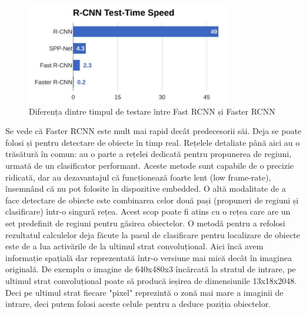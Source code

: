 \begin{figure}[h!]
    	\centering
	\captionsetup{justification=centering, margin=2cm}
	\includegraphics[width=0.8\textwidth]{figures/faster_rcnn_speed.png}
	\caption{Diferența dintre timpul de testare între  Fast RCNN și  Faster RCNN \cite{rcnn_vs_fast_rcnn}}
	\label{fig:class_detect_segment}
\end{figure}
Se vede că Faster RCNN este mult mai rapid decât predecesorii săi. Deja se poate folosi și pentru detectare de obiecte în timp real.\newline
Rețelele detaliate până aici au o trăsătură în comun: au o parte a rețelei dedicată pentru propunerea de regiuni, urmată de un clasificator performant. Aceste metode sunt capabile de o precizie ridicată, dar au dezavantajul că funcționează foarte lent (low frame-rate), însemnând că nu pot folosite în dispozitive embedded.\newline
O altă modalitate de a face detectare de obiecte este combinarea celor două pași (propuneri de regiuni și clasificare) într-o singură rețea. Acest scop poate fi atins cu o rețea care are un set predefinit de regiuni pentru găsirea obiectelor.\newline
O metodă pentru a refolosi rezultatul calculelor deja făcute la pasul de clasificare pentru localizare de obiecte este de a lua activările de la ultimul strat convoluțional. Aici încă avem informație spațială dar reprezentată într-o versiune mai mică decât în imaginea originală. De exemplu o imagine de 640x480x3 încărcată la stratul de intrare, pe ultimul strat convoluțional poate să producă ieșirea de dimensiunile 13x18x2048.\newline
Deci pe ultimul strat fiecare "pixel" reprezintă o zonă mai mare a imaginii de intrare, deci putem folosi aceste celule pentru a deduce poziția obiectelor.

